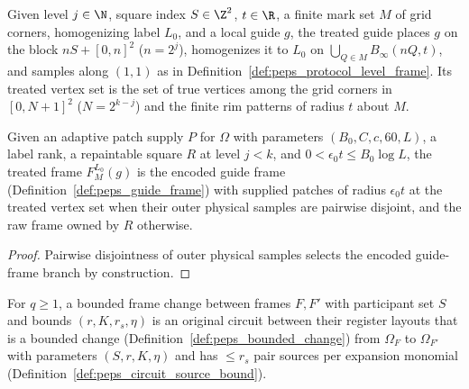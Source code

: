 \begin{definition}
    \label{def:peps_protocol_treated_frame}
    \leanok
    Given level $j\in\N$, square index $S\in\Z^2$, $t\in\R$, a finite mark set $M$ of grid corners, homogenizing label $L_0$, and a local guide $g$, the treated guide places $g$ on the block $nS+[0,n]^2$ ($n=2^j$), homogenizes it to $L_0$ on $\bigcup_{Q\in M}B_\infty(nQ,t)$, and samples along $(1,1)$ as in Definition~\ref{def:peps_protocol_level_frame}. Its treated vertex set is the set of true vertices among the grid corners in $[0,N+1]^2$ ($N=2^{k-j}$) and the finite rim patterns of radius $t$ about $M$.

    Given an adaptive patch supply $P$ for $\Omega$ with parameters $(B_0,C,c,60,L)$, a label rank, a repaintable square $R$ at level $j<k$, and $0<\epsilon_0t\le B_0\log L$, the treated frame $F_M^{L_0}(g)$ is the encoded guide frame (Definition~\ref{def:peps_guide_frame}) with supplied patches of radius $\epsilon_0t$ at the treated vertex set when their outer physical samples are pairwise disjoint, and the raw frame owned by $R$ otherwise.
\end{definition}

\begin{proof}\leanok
    Pairwise disjointness of outer physical samples selects the encoded guide-frame branch by construction.
\end{proof}

\begin{definition}
    \label{def:peps_frame_change}
    \leanok
    For $q\ge1$, a bounded frame change between frames $F,F'$ with participant set $S$ and bounds $(r,K,r_s,\eta)$ is an original circuit between their register layouts that is a bounded change (Definition~\ref{def:peps_bounded_change}) from $\Omega_F$ to $\Omega_{F'}$ with parameters $(S,r,K,\eta)$ and has $\le r_s$ pair sources per expansion monomial (Definition~\ref{def:peps_circuit_source_bound}).
\end{definition}

